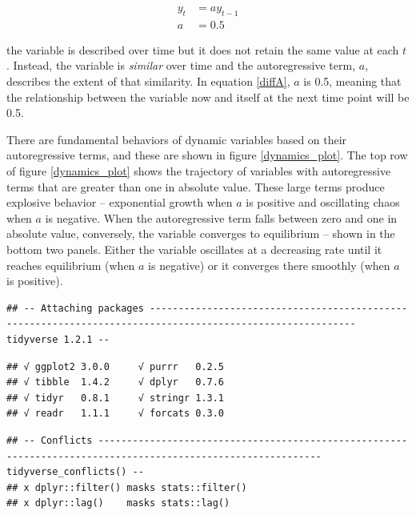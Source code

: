 \documentclass[]{article}
\begin{document}
\begin{equation}
\begin{split}
\label{diffA}
y_{t} &= a y_{t-1} \\ 
a &= 0.5
\end{split}
\end{equation}

\noindent the variable is described over time but it does not retain the
same value at each \(t\). Instead, the variable is \emph{similar} over
time and the autoregressive term, \(a\), describes the extent of that
similarity. In equation \ref{diffA}, \(a\) is 0.5, meaning that the
relationship between the variable now and itself at the next time point
will be 0.5.

There are fundamental behaviors of dynamic variables based on their
autoregressive terms, and these are shown in figure \ref{dynamics_plot}.
The top row of figure \ref{dynamics_plot} shows the trajectory of
variables with autoregressive terms that are greater than one in
absolute value. These large terms produce explosive behavior --
exponential growth when \(a\) is positive and oscillating chaos when
\(a\) is negative. When the autoregressive term falls between zero and
one in absolute value, conversely, the variable converges to equilibrium
-- shown in the bottom two panels. Either the variable oscillates at a
decreasing rate until it reaches equilibrium (when \(a\) is negative) or
it converges there smoothly (when \(a\) is positive).

\begin{verbatim}
## -- Attaching packages ---------------------------------------------------------------------------------------------------------- tidyverse 1.2.1 --
\end{verbatim}

\begin{verbatim}
## √ ggplot2 3.0.0     √ purrr   0.2.5
## √ tibble  1.4.2     √ dplyr   0.7.6
## √ tidyr   0.8.1     √ stringr 1.3.1
## √ readr   1.1.1     √ forcats 0.3.0
\end{verbatim}

\begin{verbatim}
## -- Conflicts ------------------------------------------------------------------------------------------------------------- tidyverse_conflicts() --
## x dplyr::filter() masks stats::filter()
## x dplyr::lag()    masks stats::lag()
\end{verbatim}
\end{document}
